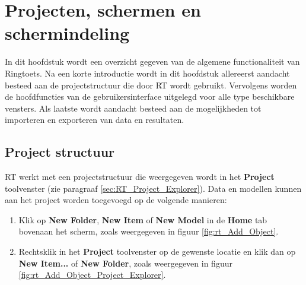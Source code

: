 
\chapter{Projecten, schermen en schermindeling}
\label{ch:general}

In dit hoofdstuk wordt een overzicht gegeven van de algemene functionaliteit van Ringtoets. Na een korte introductie wordt in dit hoofdstuk allereerst aandacht besteed aan de projectstructuur die door RT wordt gebruikt. Vervolgens worden de hoofdfuncties van de gebruikersinterface uitgelegd voor alle type beschikbare vensters. Als laatste wordt aandacht besteed aan de mogelijkheden tot importeren en exporteren van data en resultaten.

\section{Project structuur}
	\label{sec:RT_Project_Structure}
RT werkt met een projectstructuur die weergegeven wordt in het \textbf{Project} toolvenster (zie paragraaf \ref{sec:RT_Project_Explorer}). Data en modellen kunnen aan het project worden toegevoegd op de volgende manieren:

\begin{enumerate}
	\item Klik op \textbf{New Folder}, \textbf{New Item} of \textbf{New Model} in de \textbf{Home} tab bovenaan het scherm, zoals weergegeven in figuur \ref{fig:rt_Add_Object}.
	\item Rechtsklik in het \textbf{Project} toolvenster op de gewenste locatie en klik dan op \textbf{New Item...} of \textbf{New Folder}, zoals weergegeven in figuur \ref{fig:rt_Add_Object_Project_Explorer}.
\end{enumerate}

